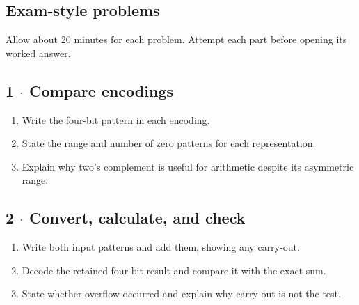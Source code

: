 \documentclass[11pt]{article}
\begin{document}
\begin{keepsection}
\section{Exam-style problems}

Allow about 20 minutes for each problem. Attempt each part before opening its worked answer.

\begin{keepsection}
\subsection{1 \ensuremath{\cdot} Compare encodings}

\begin{enumerate}
\item Write the four-bit pattern in each encoding.
\item State the range and number of zero patterns for each representation.
\item Explain why two’s complement is useful for arithmetic despite its asymmetric range.
\end{enumerate}

\end{keepsection}

\begin{keepsection}
\subsection{2 \ensuremath{\cdot} Convert, calculate, and check}

\begin{enumerate}
\item Write both input patterns and add them, showing any carry-out.
\item Decode the retained four-bit result and compare it with the exact sum.
\item State whether overflow occurred and explain why carry-out is not the test.
\end{enumerate}

\end{keepsection}

\begin{keepsection}

\end{keepsection}
\end{keepsection}
\end{document}

